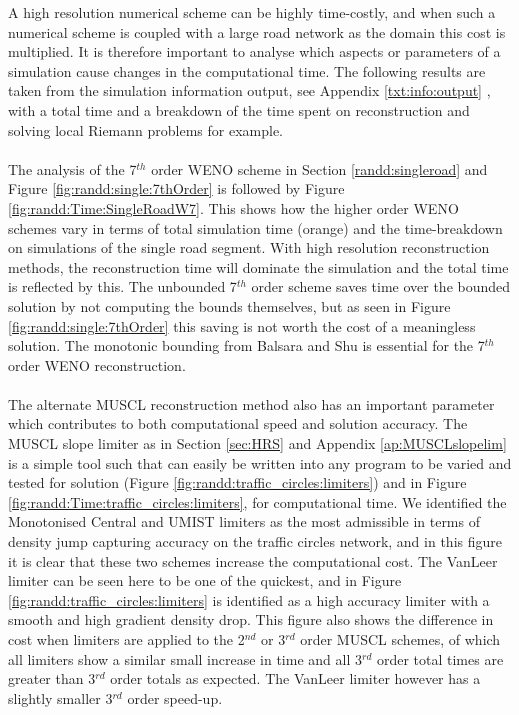 	A high resolution numerical scheme can be highly time-costly,  and when such a numerical scheme is coupled with a large road network as the domain this cost is multiplied. It is therefore important to analyse which aspects or parameters of a simulation cause changes in the computational time. The following results are taken from the simulation information output, see Appendix \ref{txt:info:output} , with a total time and a breakdown of the time spent on reconstruction and solving local Riemann problems for example. 
	\\ \\
	The analysis of the 7$^{th}$ order WENO scheme in Section \ref{randd:singleroad} and Figure \ref{fig:randd:single:7thOrder} is followed by Figure \ref{fig:randd:Time:SingleRoadW7}. This shows how the higher order WENO schemes vary in terms of total simulation time (orange) and the time-breakdown on simulations of the single road segment. With high resolution reconstruction methods, the reconstruction time will dominate the simulation and the total time is reflected by this. The unbounded 7$^{th}$ order scheme saves time over the bounded solution by not computing the bounds themselves, but as seen in Figure \ref{fig:randd:single:7thOrder} this saving is not worth the cost of a meaningless solution. The monotonic bounding from Balsara and Shu \cite{BalsaraShu00} is essential for the 7$^{th}$ order WENO reconstruction.
	\\ \\
	The alternate MUSCL reconstruction method also has an important parameter which contributes to both computational speed and solution accuracy. The MUSCL slope limiter as in Section \ref{sec:HRS} and Appendix \ref{ap:MUSCLslopelim} is a simple tool such that can easily be written into any program to be varied and tested for solution (Figure \ref{fig:randd:traffic_circles:limiters}) and in Figure \ref{fig:randd:Time:traffic_circles:limiters}, for computational time. We identified the Monotonised Central \cite{VanLeer77} and UMIST \cite{Lien94} limiters as the most admissible in terms of density jump capturing accuracy on the traffic circles network, and in this figure it is clear that these two schemes increase the computational cost. The VanLeer \cite{VanLeer74} limiter can be seen here to be one of the quickest, and in Figure \ref{fig:randd:traffic_circles:limiters} is identified as a high accuracy limiter with a smooth and high gradient density drop. This figure also shows the difference in cost when limiters are applied to the 2$^{nd}$ or 3$^{rd}$ order MUSCL schemes, of which all limiters show a similar small increase in time and all 3$^{rd}$ order total times are greater than 3$^{rd}$ order totals as expected. The VanLeer \cite{VanLeer74} limiter however has a slightly smaller 3$^{rd}$ order speed-up.  
